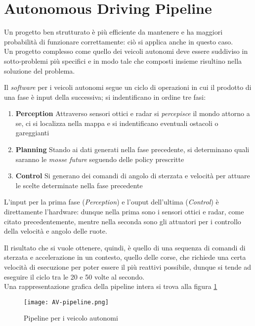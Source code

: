 \section{Autonomous Driving Pipeline}
Un progetto ben strutturato è più efficiente da mantenere e ha maggiori probabilità
di funzionare correttamente: ciò si applica anche in questo caso.\\
Un progetto complesso come quello dei veicoli autonomi deve essere suddiviso in sotto-problemi
più specifici e in modo tale che composti insieme risultino nella soluzione del problema.
\par

\noindent Il \emph{software} per i veicoli autonomi segue un ciclo di operazioni
in cui il prodotto di una fase è input della successiva; si indentificano in ordine tre fasi:
\begin{enumerate}
	\item \textbf{Perception} Attraverso sensori ottici e radar si \emph{percepisce} il mondo attorno a se,
	      ci si localizza nella mappa e si indentificano eventuali ostacoli o gareggianti
	\item \textbf{Planning} Stando ai dati generati nella fase precedente,
	      si determinano quali saranno le \emph{mosse future} seguendo delle policy prescritte
	\item \textbf{Control} Si generano dei comandi di angolo di sterzata e velocità per attuare le scelte
	      determinate nella fase precedente
\end{enumerate}

L'input per la prima fase (\textit{Perception}) e l'ouput dell'ultima (\textit{Control})
è direttamente l'hardware: dunque nella prima sono i sensori ottici e radar, come citato precedentemente,
mentre nella seconda sono gli attuatori per i controllo della velocità e angolo delle ruote.\par
Il risultato che si vuole ottenere, quindi, è quello di una sequenza di comandi di sterzata e accelerazione
in un contesto, quello delle corse, che richiede una certa velocità di esecuzione per poter essere
il più reattivi possibile, dunque si tende ad eseguire il ciclo tra le 20 e 50 volte al secondo.\\
Una rappresentazione grafica della pipeline intera si trova alla figura \ref{fig:av-pipeline}\\
\begin{figure}[t]
	\centering
	\texttt{[image: AV-pipeline.png]}
	\caption{Pipeline per i veicolo autonomi}
	\label{fig:av-pipeline}
\end{figure}

